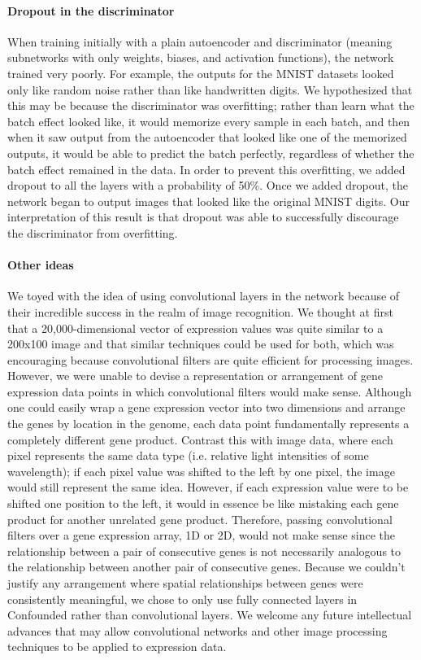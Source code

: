 \documentclass{article}
\begin{document}
\paragraph{Dropout in the discriminator}

When training initially with a plain autoencoder and discriminator (meaning subnetworks with only weights, biases, and activation functions), the network trained very poorly.
For example, the outputs for the MNIST datasets looked only like random noise rather than like handwritten digits.
We hypothesized that this may be because the discriminator was overfitting;
rather than learn what the batch effect looked like, it would memorize every sample in each batch, and then when it saw output from the autoencoder that looked like one of the memorized outputs, it would be able to predict the batch perfectly, regardless of whether the batch effect remained in the data.
In order to prevent this overfitting, we added dropout to all the layers with a probability of 50\%.
Once we added dropout, the network began to output images that looked like the original MNIST digits.
Our interpretation of this result is that dropout was able to successfully discourage the discriminator from overfitting.

\paragraph{Other ideas}

We toyed with the idea of using convolutional layers \cite{krizhevsky_imagenet_2012-1} in the network because of their incredible success in the realm of image recognition.
We thought at first that a 20,000-dimensional vector of expression values was quite similar to a 200x100 image and that similar techniques could be used for both, which was encouraging because convolutional filters are quite efficient for processing images.
However, we were unable to devise a representation or arrangement of gene expression data points in which convolutional filters would make sense.
Although one could easily wrap a gene expression vector into two dimensions and arrange the genes by location in the genome, each data point fundamentally represents a completely different gene product.
Contrast this with image data, where each pixel represents the same data type (i.e. relative light intensities of some wavelength); if each pixel value was shifted to the left by one pixel, the image would still represent the same idea.
However, if each expression value were to be shifted one position to the left, it would in essence be like mistaking each gene product for another unrelated gene product.
Therefore, passing convolutional filters over a gene expression array, 1D or 2D, would not make sense since the relationship between a pair of consecutive genes is not necessarily analogous to the relationship between another pair of consecutive genes.
Because we couldn't justify any arrangement where spatial relationships between genes were consistently meaningful, we chose to only use fully connected layers in Confounded rather than convolutional layers.
We welcome any future intellectual advances that may allow convolutional networks and other image processing techniques to be applied to expression data.
\end{document}
